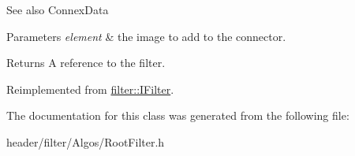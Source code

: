 \begin{DoxySeeAlso}{See also}
Connex\+Data 
\end{DoxySeeAlso}

\begin{DoxyParams}{Parameters}
{\em element} & the image to add to the connector. \\
\hline
\end{DoxyParams}
\begin{DoxyReturn}{Returns}
A reference to the filter. 
\end{DoxyReturn}


Reimplemented from \hyperlink{classfilter_1_1_i_filter}{filter\+::\+I\+Filter}.



The documentation for this class was generated from the following file\+:\begin{DoxyCompactItemize}
\item 
header/filter/\+Algos/Root\+Filter.\+h\end{DoxyCompactItemize}

